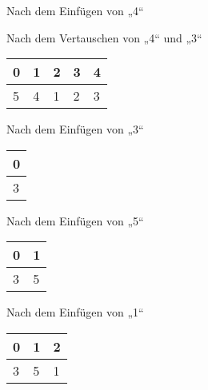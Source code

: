 \documentclass{bschlangaul-aufgabe}
\begin{document}
\begin{enumerate}
\begin{enumerate}
\begin{bBaum}{Nach dem Einfügen von „4“}
\end{bBaum}

\begin{bBaum}{Nach dem Vertauschen von „4“ und „3“}
\begin{tabular}{lllll}
\bf{0} & \bf{1} & \bf{2} & \bf{3} & \bf{4} \\
\hline
5      & 4      & 1      & 2      & 3      \\
\end{tabular}

\end{bBaum}

%


\begin{bBaum}{Nach dem Einfügen von „3“}
\begin{tabular}{l}
\bf{0} \\
\hline
3      \\
\end{tabular}

\end{bBaum}

\begin{bBaum}{Nach dem Einfügen von „5“}
\begin{tabular}{ll}
\bf{0} & \bf{1} \\
\hline
3      & 5      \\
\end{tabular}

\end{bBaum}

\begin{bBaum}{Nach dem Einfügen von „1“}
\begin{tabular}{lll}
\bf{0} & \bf{1} & \bf{2} \\
\hline
3      & 5      & 1      \\
\end{tabular}


\end{bBaum}
\end{enumerate}
\end{enumerate}
\end{document}
